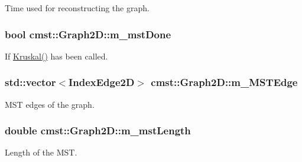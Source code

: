 Time used for reconstructing the graph. 

\subsubsection[{\texorpdfstring{m\+\_\+mst\+Done}{m_mstDone}}]{\setlength{\rightskip}{0pt plus 5cm}bool cmst\+::\+Graph2\+D\+::m\+\_\+mst\+Done\hspace{0.3cm}{\ttfamily [private]}}\hypertarget{classcmst_1_1_graph2_d_ab7c087fe87b5750195100ff25f10f628}{}\label{classcmst_1_1_graph2_d_ab7c087fe87b5750195100ff25f10f628}


If \hyperlink{classcmst_1_1_graph2_d_a034d2d37b2d106c0e25d7ad7bc67907e}{Kruskal()} has been called. 

\subsubsection[{\texorpdfstring{m\+\_\+\+M\+S\+T\+Edge}{m_MSTEdge}}]{\setlength{\rightskip}{0pt plus 5cm}std\+::vector$<${\bf Index\+Edge2D}$>$ cmst\+::\+Graph2\+D\+::m\+\_\+\+M\+S\+T\+Edge\hspace{0.3cm}{\ttfamily [protected]}}\hypertarget{classcmst_1_1_graph2_d_a1cc96b5251162964ac21f46955ac8271}{}\label{classcmst_1_1_graph2_d_a1cc96b5251162964ac21f46955ac8271}


M\+ST edges of the graph. 

\subsubsection[{\texorpdfstring{m\+\_\+mst\+Length}{m_mstLength}}]{\setlength{\rightskip}{0pt plus 5cm}double cmst\+::\+Graph2\+D\+::m\+\_\+mst\+Length\hspace{0.3cm}{\ttfamily [private]}}\hypertarget{classcmst_1_1_graph2_d_a722498b25b96d26e68e378ba970d5e65}{}\label{classcmst_1_1_graph2_d_a722498b25b96d26e68e378ba970d5e65}


Length of the M\+ST. 

